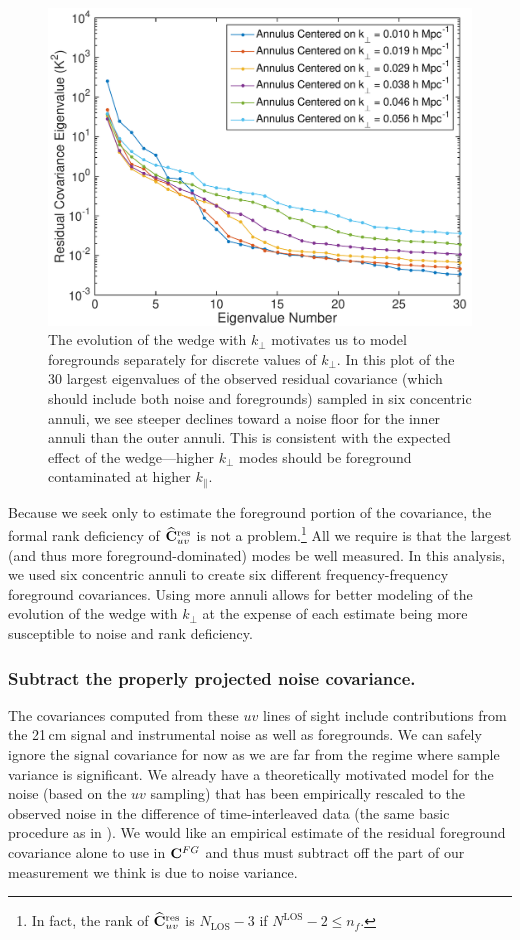 \begin{figure}[]  
	\centering 
	\includegraphics[width=.48\textwidth]{chap4_empirical_covariance/wedge_eigenvalues.pdf}
	\caption[Plot of the 30 largest eigenvalues of the observed residual foreground covariance matrix.]{The evolution of the wedge with $k_\perp$ motivates us to model foregrounds separately for discrete values of $k_\perp$. In this plot of the 30 largest eigenvalues of the observed residual covariance (which should include both noise and foregrounds) sampled in six concentric annuli, we see steeper declines toward a noise floor for the inner annuli than the outer annuli. This is consistent with the expected effect of the wedge---higher $k_\perp$ modes should be foreground contaminated at higher $k_\|$.}
	\label{fig:wedge_eigenvalues}
\end{figure}
 
Because we seek only to estimate the foreground portion of the covariance, the formal rank deficiency of $\widehat{\mathbf{C}}^\text{res}_{uv}$ is not a problem.\footnote{In fact, the rank of $\widehat{\mathbf{C}}^\text{res}_{uv}$ is $N_\text{LOS} - 3$ if $N^\text{LOS}-2 \le n_f$.} All we require is that the largest (and thus more foreground-dominated) modes be well measured. In this analysis, we used six concentric annuli to create six different frequency-frequency foreground covariances. Using more annuli allows for better modeling of the evolution of the wedge with $k_\perp$ at the expense of each estimate being more susceptible to noise and rank deficiency. 


\subsubsection{Subtract the properly projected noise covariance.}
 
The covariances computed from these $uv$ lines of sight include contributions from the 21\,cm signal and instrumental noise as well as foregrounds. We can safely ignore the signal covariance for now as we are far from the regime where sample variance is significant. We already have a theoretically motivated model for the noise (based on the $uv$ sampling) that has been empirically rescaled to the observed noise in the difference of time-interleaved data (the same basic procedure as in \citet{X13}). We would like an empirical estimate of the residual foreground covariance alone to use in $\mathbf{C}^{FG}$ and thus must subtract off the part of our measurement we think is due to noise variance.

